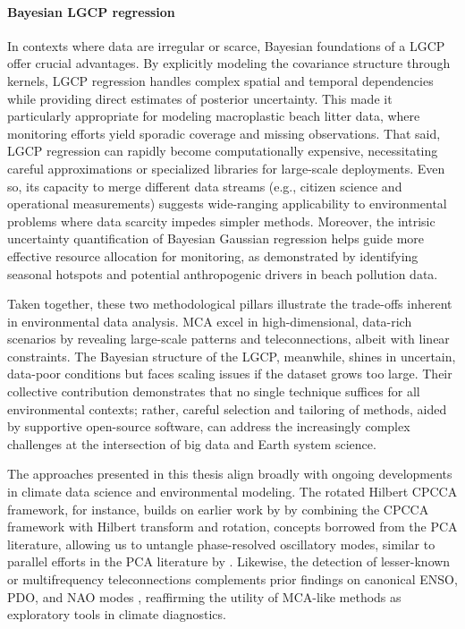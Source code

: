 \paragraph{Bayesian LGCP regression}
In contexts where data are irregular or scarce, Bayesian foundations of a LGCP offer crucial advantages. By explicitly modeling the covariance structure through kernels, LGCP regression handles complex spatial and temporal dependencies while providing direct estimates of posterior uncertainty. This made it particularly appropriate for modeling macroplastic beach litter data, where monitoring efforts yield sporadic coverage and missing observations. That said, LGCP regression can rapidly become computationally expensive, necessitating careful approximations or specialized libraries for large-scale deployments. Even so, its capacity to merge different data streams (e.g., citizen science and operational measurements) suggests wide-ranging applicability to environmental problems where data scarcity impedes simpler methods. Moreover, the intrisic uncertainty quantification of Bayesian Gaussian regression helps guide more effective resource allocation for monitoring, as demonstrated by identifying seasonal hotspots and potential anthropogenic drivers in beach pollution data.

Taken together, these two methodological pillars illustrate the trade-offs inherent in environmental data analysis. MCA excel in high-dimensional, data-rich scenarios by revealing large-scale patterns and teleconnections, albeit with linear constraints. The Bayesian structure of the LGCP, meanwhile, shines in uncertain, data-poor conditions but faces scaling issues if the dataset grows too large. Their collective contribution demonstrates that no single technique suffices for all environmental contexts; rather, careful selection and tailoring of methods, aided by supportive open-source software, can address the increasingly complex challenges at the intersection of big data and Earth system science.


The approaches presented in this thesis align broadly with ongoing developments in climate data science and environmental modeling. The rotated Hilbert CPCCA framework, for instance, builds on earlier work by \citet{swenson_continuum_2015} by combining the CPCCA framework with Hilbert transform and rotation, concepts borrowed from the PCA literature, allowing us to untangle phase-resolved oscillatory modes, similar to parallel efforts in the PCA literature by \citet[e.g.][]{bueso_nonlinear_2020,guilloteau_rotated_2020}.  Likewise, the detection of lesser-known or multifrequency teleconnections complements prior findings on canonical ENSO, PDO, and NAO modes \cite[e.g.][]{timmermann_ninosouthern_2018, mezzina_dynamics_2020,wiedermann_differential_2021,tang_positive_2024}, reaffirming the utility of MCA-like methods as exploratory tools in climate diagnostics.

